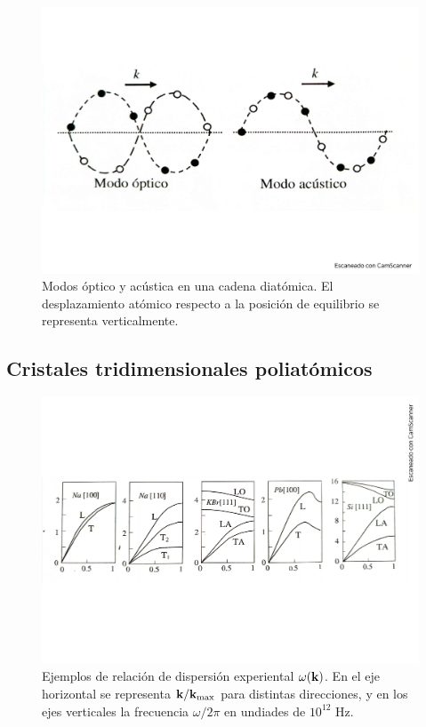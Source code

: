 \begin{figure}[h!] \centering
    \includegraphics[scale=0.5]{Cuerpo/Ch_04/Fotos libro 6.pdf}
    \caption{Modos óptico y acústica en una cadena diatómica. El desplazamiento atómico respecto a la posición de equilibrio se representa verticalmente.}
    \label{Fig:04-06}
\end{figure}    

\subsection{Cristales tridimensionales poliatómicos}

\begin{figure}[h!] \centering
    \includegraphics[scale=0.5]{Cuerpo/Ch_04/Fotos libro 7.pdf}
    \caption{Ejemplos de relación de dispersión experiental $\omega (\mathbf{k})$. En el eje horizontal se representa $\mathbf{k}/\mathbf{k}_{\max}$ para distintas direcciones, y en los ejes verticales la frecuencia $\omega/2\pi$ en undiades de $10^{12}$ Hz.}
    \label{Fig:04-07}
\end{figure}    



